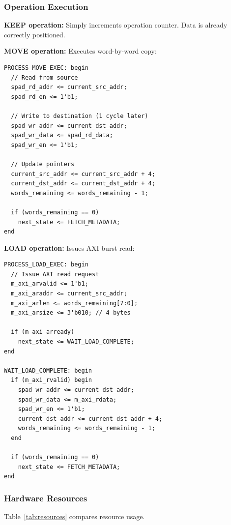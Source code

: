 \documentclass[conference]{IEEEtran}
\begin{document}
\subsubsection{Operation Execution}

\textbf{KEEP operation:} Simply increments operation counter. Data is already correctly positioned.

\textbf{MOVE operation:} Executes word-by-word copy:
\begin{lstlisting}[caption={MOVE execution (Verilog)},label={lst:move}]
PROCESS_MOVE_EXEC: begin
  // Read from source
  spad_rd_addr <= current_src_addr;
  spad_rd_en <= 1'b1;
  
  // Write to destination (1 cycle later)
  spad_wr_addr <= current_dst_addr;
  spad_wr_data <= spad_rd_data;
  spad_wr_en <= 1'b1;
  
  // Update pointers
  current_src_addr <= current_src_addr + 4;
  current_dst_addr <= current_dst_addr + 4;
  words_remaining <= words_remaining - 1;
  
  if (words_remaining == 0)
    next_state <= FETCH_METADATA;
end
\end{lstlisting}

\textbf{LOAD operation:} Issues AXI burst read:
\begin{lstlisting}[caption={LOAD execution (Verilog)},label={lst:load}]
PROCESS_LOAD_EXEC: begin
  // Issue AXI read request
  m_axi_arvalid <= 1'b1;
  m_axi_araddr <= current_src_addr;
  m_axi_arlen <= words_remaining[7:0];
  m_axi_arsize <= 3'b010; // 4 bytes
  
  if (m_axi_arready)
    next_state <= WAIT_LOAD_COMPLETE;
end

WAIT_LOAD_COMPLETE: begin
  if (m_axi_rvalid) begin
    spad_wr_addr <= current_dst_addr;
    spad_wr_data <= m_axi_rdata;
    spad_wr_en <= 1'b1;
    current_dst_addr <= current_dst_addr + 4;
    words_remaining <= words_remaining - 1;
  end
  
  if (words_remaining == 0)
    next_state <= FETCH_METADATA;
end
\end{lstlisting}

\subsubsection{Hardware Resources}

Table~\ref{tab:resources} compares resource usage.
\end{document}
